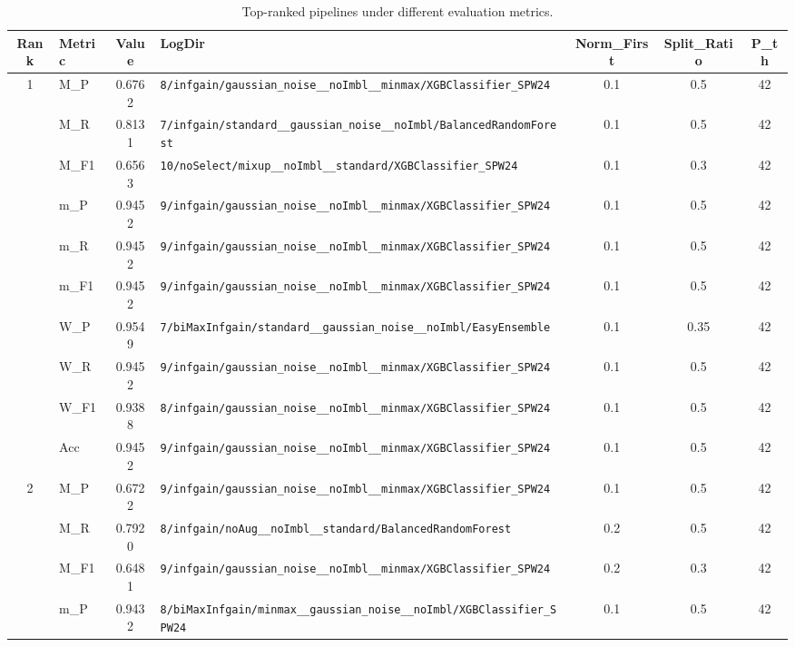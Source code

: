 \begin{table}[htbp]
\caption{Top-ranked pipelines under different evaluation metrics.}
\label{tab:rank_metric_vertical}
\centering
\small
\setlength{\tabcolsep}{4pt}
\begin{tabular}{|c|l|c|>{\ttfamily\footnotesize}p{7.2cm}|c|c|c|}
\hline
Rank & Metric & Value & LogDir & Norm\_First & Split\_Ratio & P\_th \\
\hline
\multirow{10}{*}{1} & M\_P & 0.6762 & \texttt{8/infgain/gaussian\_noise\_\_noImbl\_\_minmax/XGBClassifier\_SPW24} & 0.1 & 0.5  & 42 \\ 
 & M\_R & 0.8131 & \texttt{7/infgain/standard\_\_gaussian\_noise\_\_noImbl/BalancedRandomForest} & 0.1 & 0.5  & 42 \\ 
 & M\_F1 & 0.6563 & \texttt{10/noSelect/mixup\_\_noImbl\_\_standard/XGBClassifier\_SPW24} & 0.1 & 0.3  & 42 \\ 
 & m\_P & 0.9452 & \texttt{9/infgain/gaussian\_noise\_\_noImbl\_\_minmax/XGBClassifier\_SPW24} & 0.1 & 0.5  & 42 \\ 
 & m\_R & 0.9452 & \texttt{9/infgain/gaussian\_noise\_\_noImbl\_\_minmax/XGBClassifier\_SPW24} & 0.1 & 0.5  & 42 \\ 
 & m\_F1 & 0.9452 & \texttt{9/infgain/gaussian\_noise\_\_noImbl\_\_minmax/XGBClassifier\_SPW24} & 0.1 & 0.5  & 42 \\ 
 & W\_P & 0.9549 & \texttt{7/biMaxInfgain/standard\_\_gaussian\_noise\_\_noImbl/EasyEnsemble} & 0.1 & 0.35  & 42 \\ 
 & W\_R & 0.9452 & \texttt{9/infgain/gaussian\_noise\_\_noImbl\_\_minmax/XGBClassifier\_SPW24} & 0.1 & 0.5  & 42 \\ 
 & W\_F1 & 0.9388 & \texttt{8/infgain/gaussian\_noise\_\_noImbl\_\_minmax/XGBClassifier\_SPW24} & 0.1 & 0.5  & 42 \\ 
 & Acc & 0.9452 & \texttt{9/infgain/gaussian\_noise\_\_noImbl\_\_minmax/XGBClassifier\_SPW24} & 0.1 & 0.5  & 42 \\ 
\hline
\multirow{10}{*}{2} & M\_P & 0.6722 & \texttt{9/infgain/gaussian\_noise\_\_noImbl\_\_minmax/XGBClassifier\_SPW24} & 0.1 & 0.5  & 42 \\ 
 & M\_R & 0.7920 & \texttt{8/infgain/noAug\_\_noImbl\_\_standard/BalancedRandomForest} & 0.2 & 0.5  & 42 \\ 
 & M\_F1 & 0.6481 & \texttt{9/infgain/gaussian\_noise\_\_noImbl\_\_minmax/XGBClassifier\_SPW24} & 0.2 & 0.3  & 42 \\ 
 & m\_P & 0.9432 & \texttt{8/biMaxInfgain/minmax\_\_gaussian\_noise\_\_noImbl/XGBClassifier\_SPW24} & 0.1 & 0.5  & 42 \\ 

\end{tabular}
\end{table}
